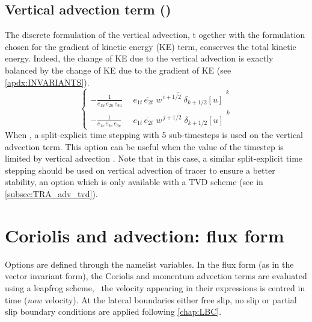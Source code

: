 \documentclass[../main/NEMO_manual]{subfiles}
\begin{document}
\subsection[Vertical advection term (\textit{dynzad.F90})]{Vertical advection term (\protect{})}
\label{subsec:DYN_zad}

The discrete formulation of the vertical advection, t
ogether with the formulation chosen for the gradient of kinetic energy (KE) term,
conserves the total kinetic energy.
Indeed, the change of KE due to the vertical advection is exactly balanced by
the change of KE due to the gradient of KE (see \autoref{apdx:INVARIANTS}).
\[
  \left\{
    \begin{aligned}
      -\frac{1} {e_{1u}\,e_{2u}\,e_{3u}} &\ \overline{\ \overline{ e_{1t}\,e_{2t}\;w } ^{\,i+1/2}  \;\delta_{k+1/2} \left[ u \right]\  }^{\,k}  \\
      -\frac{1} {e_{1v}\,e_{2v}\,e_{3v}}  &\ \overline{\ \overline{ e_{1t}\,e_{2t}\;w } ^{\,j+1/2}  \;\delta_{k+1/2} \left[ u \right]\  }^{\,k}
    \end{aligned}
  \right.
\]
When ,
a split-explicit time stepping with 5 sub-timesteps is used on the vertical advection term.
This option can be useful when the value of the timestep is limited by vertical advection \citep{lemarie.debreu.ea_OM15}.
Note that in this case,
a similar split-explicit time stepping should be used on vertical advection of tracer to ensure a better stability,
an option which is only available with a TVD scheme (see  in \autoref{subsec:TRA_adv_tvd}).

\section{Coriolis and advection: flux form}
\label{sec:DYN_adv_cor_flux}

Options are defined through the  namelist variables.
In the flux form (as in the vector invariant form),
the Coriolis and momentum advection terms are evaluated using a leapfrog scheme,
\ie\ the velocity appearing in their expressions is centred in time (\textit{now} velocity).
At the lateral boundaries either free slip,
no slip or partial slip boundary conditions are applied following \autoref{chap:LBC}.
\end{document}
